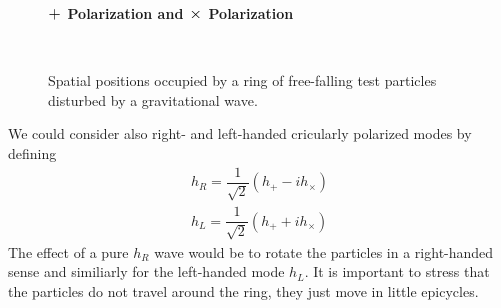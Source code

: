 \begin{figure}
\centering
    \textbf{$\mathlarger{\mathlarger{+}}$ Polarization and $\mathlarger{\mathlarger{\times}}$ Polarization}\par\medskip
\centering
{} \quad
{} \\
\caption{Spatial positions occupied by a ring of free-falling test particles disturbed by a gravitational wave.}
\label{plus_and_times}
\end{figure}

We could consider also right- and left-handed cricularly polarized modes by defining
\begin{eqnarray}
\label{r_polarized}
h_{R} = \dfrac{1}{\sqrt{2}} (h_{+} - i h_{\times})
\\
\label{l_polarized}
h_{L} = \dfrac{1}{\sqrt{2}} (h_{+} + i h_{\times})
\end{eqnarray}
The effect of a pure $h_R$ wave would be to rotate the particles in a right-handed sense and similiarly for the left-handed mode $h_{L}$. It is important to stress that the particles do not travel around the ring, they just move in little epicycles.

